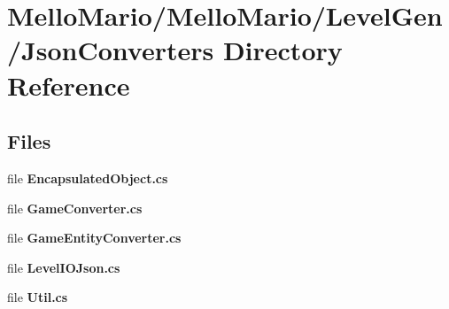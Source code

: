 \section{Mello\+Mario/\+Mello\+Mario/\+Level\+Gen/\+Json\+Converters Directory Reference}
\label{dir_43efe22ff4525d08aee1d898598e162b}
\subsection*{Files}
\begin{DoxyCompactItemize}
\item 
file \textbf{ Encapsulated\+Object.\+cs}
\item 
file \textbf{ Game\+Converter.\+cs}
\item 
file \textbf{ Game\+Entity\+Converter.\+cs}
\item 
file \textbf{ Level\+I\+O\+Json.\+cs}
\item 
file \textbf{ Util.\+cs}
\end{DoxyCompactItemize}
